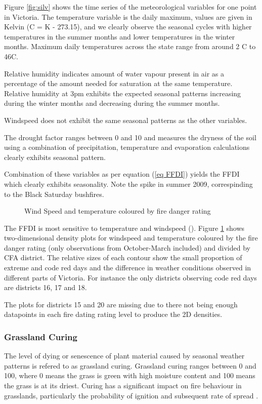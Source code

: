 \documentclass[11pt,a4paper]{article}
\begin{document}
Figure \ref{fig:silv} shows the time series of the meteorological variables for one point in Victoria. The temperature variable is the daily maximum, values are given in Kelvin (\degree C = K - 273.15), and we clearly observe the seasonal cycles with higher temperatures in the summer months and lower temperatures in the winter months. Maximum daily temperatures across the state range from around 2 \degree C to 46\degree  C. 

Relative humidity indicates amount of water vapour present in air as a percentage of the amount needed for saturation at the same temperature. Relative humidity at 3pm exhibits the expected seasonal patterns increasing during the winter months and decreasing during the summer months. 

Windspeed does not exhibit the same seasonal patterns as the other variables. 

The drought factor ranges between 0 and 10 and measures the dryness of the soil using a combination of precipitation, temperature and evaporation calculations \citep{keetch68} clearly exhibits seasonal pattern.

Combination of these variables as per equation (\ref{eq FFDI}) yields the FFDI which clearly exhibits seasonality. Note the spike in summer 2009, correspinding to the Black Saturday bushfires.

\begin{figure}[h]
	\centering 
	\caption{Wind Speed and temperature coloured by fire danger rating} 
	\label{fig:tw_fdr} 
\end{figure}

The FFDI is most sensitive to temperature and windspeed (\cite{dowdy10}). Figure \ref{fig:tw_fdr} shows two-dimensional density plots for windspeed and temperature coloured by the fire danger rating (only observations from October-March included) and divided by CFA district. The relative sizes of each contour show the small proportion of extreme and code red days and the difference in weather conditions observed in different parts of Victoria. For instance the only districts observing code red days are districts 16, 17 and 18. 

The plots for districts 15 and 20 are missing due to there not being enough datapoints in each fire dating rating level to produce the 2D densities.  
 
\subsubsection{Grassland Curing}
The level of dying or senescence of plant material caused by seasonal weather patterns is refered to as grassland curing. Grassland curing ranges between 0 and 100, where 0 means the grass is green with high moisture content and 100 means the grass is at its driest. Curing has a significant impact on fire behaviour in grasslands, particularly the probability of ignition and subsequent rate of spread \citep{cheney08}. 
\end{document}
